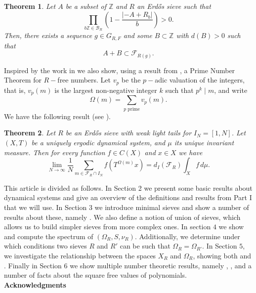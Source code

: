 \documentclass[a4paper,11pt,reqno]{amsart}
\theoremstyle{plain}
\newtheorem{theorem}{Theorem}[section]
\theoremstyle{remark}
\newcommand{\z}{\mathbb{Z}}
\newcommand{\cb}{\mathcal{B}}
\newcommand{\cf}{\mathcal{F}}
\newcommand{\fr}{\mathcal{F}_R}
\newcommand{\grf}{G_{R,F}}
\begin{document}
	\begin{theorem}
		\label{thm: intro infinite sumsets}
		Let $A$ be a subset of $\z$ and $R$ an Erdős sieve such that $$\prod_{b\z \in \cb_R} \left(1-\frac{|-A+R_b|}{b}\right) >0.$$ Then, there exists a sequence $g \in\grf$ and some $B\subset \z$ with $d(B)>0$ such that $$A+B \subset \cf_{R(g)}.$$ 
	\end{theorem}
	
	Inspired by the work in \cite{Wang} we also show, using a result from \cite{Bergelson2}, a Prime Number Theorem for $R-$free numbers. Let $v_p$ be the $p-$adic valuation of the integers, that is, $v_p(m)$ is the largest non-negative integer $k$ such that $p^k \mid m$, and write $$\Omega(m) = \sum_{p \text{ prime}} v_p(m).$$ We have the following result (see ).
	\begin{theorem}
		\label{thm: intro prime num theorem rfree}
		Let $R$ be an Erdős sieve with weak light tails for $I_N = [1,N]$. Let $(X,T)$ be a uniquely ergodic dynamical system, and $\mu$ its unique invariant measure. Then for every function $f \in C(X)$ and $x \in X$ we have
		$$\lim_{N\rightarrow\infty} \frac{1}{N}\sum_{m \in \fr \cap I_N} f(T^{\Omega(m)}x) = d_I(\fr)\int_X f \,d \mu.$$
	\end{theorem}
	
	This article is divided as follows. In Section 2 we present some basic results about dynamical systems and give an overview of the definitions and results from Part I that we will use. In Section 3 we introduce minimal sieves and show a number of results about these, namely . We also define a notion of union of sieves, which allows us to build simpler sieves from more complex ones. In section $4$ we show  and compute the spectrum of $(\Omega_R,S,\nu_R)$. Additionally, we determine under which conditions two sieves $R$ and $R'$ can be such that $\Omega_R = \Omega_{R'}$. In Section $5$, we investigate the relationship between the spaces $X_R$ and $\Omega_R$, showing both  and . Finally in Section 6 we show multiple number theoretic results, namely , , and a number of facts about the square free values of polynomials.\\
	
\textbf{Acknowledgments}\\
\end{document}
